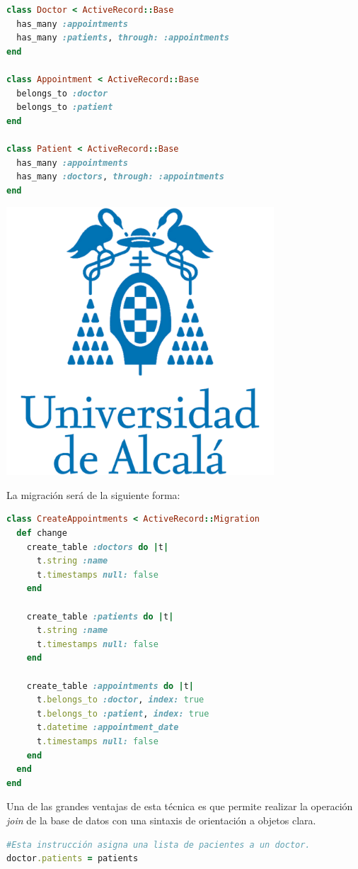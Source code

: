 \begin{lstlisting}[language=Ruby]
class Doctor < ActiveRecord::Base
  has_many :appointments
  has_many :patients, through: :appointments
end
 
class Appointment < ActiveRecord::Base
  belongs_to :doctor
  belongs_to :patient
end
 
class Patient < ActiveRecord::Base
  has_many :appointments
  has_many :doctors, through: :appointments
end
\end{lstlisting}

\includegraphics[width=10cm]{./image/logos/uahlogo3.png}

La migración será de la siguiente forma:

\begin{lstlisting}[language=Ruby]
class CreateAppointments < ActiveRecord::Migration
  def change
    create_table :doctors do |t|
      t.string :name
      t.timestamps null: false
    end
 
    create_table :patients do |t|
      t.string :name
      t.timestamps null: false
    end
 
    create_table :appointments do |t|
      t.belongs_to :doctor, index: true
      t.belongs_to :patient, index: true
      t.datetime :appointment_date
      t.timestamps null: false
    end
  end
end
\end{lstlisting}

Una de las grandes ventajas de esta técnica es que permite realizar la operación \textit{join} de la base de datos con una sintaxis de orientación a objetos clara.

\begin{lstlisting}[language=Ruby]
#Esta instrucción asigna una lista de pacientes a un doctor.
doctor.patients = patients
\end{lstlisting}


